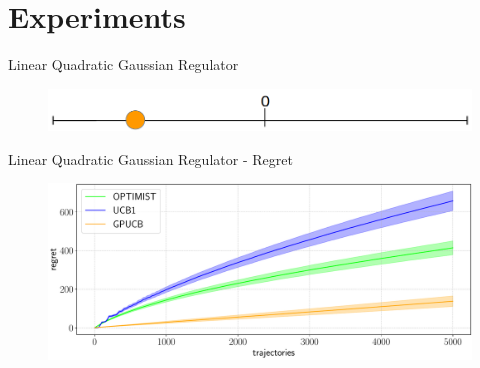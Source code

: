 \section{Experiments}

%
%

\begin{frame}{Linear Quadratic Gaussian Regulator}
	\begin{figure}
		\centering	
		\includegraphics[width=1\linewidth]{Images/LQG}\\
	\end{figure}
\end{frame}

\begin{frame}{Linear Quadratic Gaussian Regulator - Regret}
\begin{figure}
		\centering
		\includegraphics[width=1\linewidth]{Images/LQGcomparison}
\end{figure}
\end{frame}

